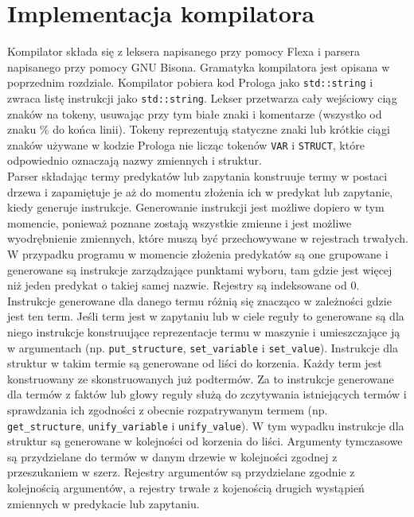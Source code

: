 \section{Implementacja kompilatora}

Kompilator składa się z leksera napisanego przy pomocy Flexa i parsera napisanego przy pomocy GNU Bisona. Gramatyka kompilatora jest opisana w poprzednim rozdziale. Kompilator pobiera kod Prologa jako \texttt{std::string} i zwraca listę instrukcji jako \texttt{std::string}. Lekser przetwarza cały wejściowy ciąg znaków na tokeny, usuwając przy tym białe znaki i komentarze (wszystko od znaku \% do końca linii). Tokeny reprezentują statyczne znaki lub krótkie ciągi znaków używane w kodzie Prologa nie licząc tokenów \texttt{VAR} i \texttt{STRUCT}, które odpowiednio oznaczają nazwy zmiennych i struktur.\\
Parser składając termy predykatów lub zapytania konstruuje termy w postaci drzewa i zapamiętuje je aż do momentu złożenia ich w predykat lub zapytanie, kiedy generuje instrukcje. Generowanie instrukcji jest możliwe dopiero w tym momencie, ponieważ poznane zostają wszystkie zmienne i jest możliwe wyodrębnienie zmiennych, które muszą być przechowywane w rejestrach trwałych. W przypadku programu w momencie złożenia predykatów są one grupowane i generowane są instrukcje zarządzające punktami wyboru, tam gdzie jest więcej niż jeden predykat o takiej samej nazwie. Rejestry są indeksowane od 0. Instrukcje generowane dla danego termu różnią się znacząco w zależności gdzie jest ten term. Jeśli term jest w zapytaniu lub w ciele reguły to generowane są dla niego instrukcje konstruujące reprezentacje termu w maszynie i umieszczające ją w argumentach (np. \texttt{put\_structure}, \texttt{set\_variable} i \texttt{set\_value}). Instrukcje dla struktur w takim termie są generowane od liści do korzenia. Każdy term jest konstruowany ze skonstruowanych już podtermów. Za to instrukcje generowane dla termów z faktów lub głowy reguły służą do zczytywania istniejących termów i sprawdzania ich zgodności z obecnie rozpatrywanym termem (np. \texttt{get\_structure}, \texttt{unify\_variable} i \texttt{unify\_value}). W tym wypadku instrukcje dla struktur są generowane w kolejności od korzenia do liści. Argumenty tymczasowe są przydzielane do termów w danym drzewie w kolejności zgodnej z przeszukaniem w szerz. Rejestry argumentów są przydzielane zgodnie z kolejnością argumentów, a rejestry trwałe z kojenością drugich wystąpień zmiennych w predykacie lub zapytaniu.\\

